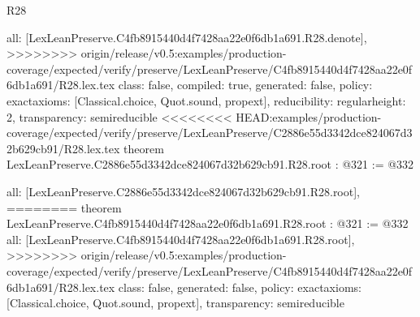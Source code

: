 \begin{lexlean}{R28}
\begin{coremodule}
{{{{{  all: [LexLeanPreserve.C4fb8915440d4f7428aa22e0f6db1a691.R28.denote],
>>>>>>>> origin/release/v0.5:examples/production-coverage/expected/verify/preserve/LexLeanPreserve/C4fb8915440d4f7428aa22e0f6db1a691/R28.lex.tex
  class: false,
  compiled: true,
  generated: false,
  policy: exact{axioms: [Classical.choice, Quot.sound, propext]},
  reducibility: regular{height: 2},
  transparency: semireducible
}
<<<<<<<< HEAD:examples/production-coverage/expected/verify/preserve/LexLeanPreserve/C2886e55d3342dce824067d32b629cb91/R28.lex.tex
theorem LexLeanPreserve.C2886e55d3342dce824067d32b629cb91.R28.root : @321 := @332 {
  all: [LexLeanPreserve.C2886e55d3342dce824067d32b629cb91.R28.root],
========
theorem LexLeanPreserve.C4fb8915440d4f7428aa22e0f6db1a691.R28.root : @321 := @332 {
  all: [LexLeanPreserve.C4fb8915440d4f7428aa22e0f6db1a691.R28.root],
>>>>>>>> origin/release/v0.5:examples/production-coverage/expected/verify/preserve/LexLeanPreserve/C4fb8915440d4f7428aa22e0f6db1a691/R28.lex.tex
  class: false,
  generated: false,
  policy: exact{axioms: [Classical.choice, Quot.sound, propext]},
  transparency: semireducible
}

}}}}}
\end{coremodule}
\end{lexlean}
